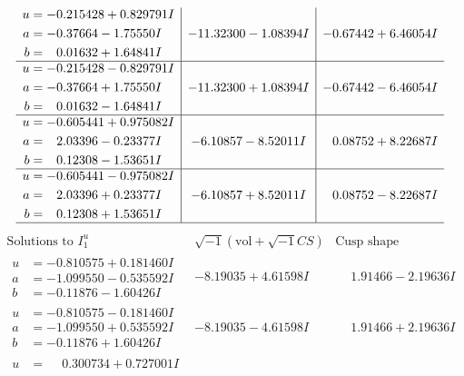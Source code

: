 \documentclass[1p]{elsarticle_modified}
\theoremstyle{definition}
\newcommand{\I}{\sqrt{-1}}
\begin{document}
$$\begin{array}{c|c|c}
\begin{aligned}
u &= -0.215428 + 0.829791 I \\
a &= -0.37664 - 1.75550 I \\
b &= \phantom{-}0.01632 + 1.64841 I\end{aligned}
 & -11.32300 - 1.08394 I & -0.67442 + 6.46054 I \\ \hline\begin{aligned}
u &= -0.215428 - 0.829791 I \\
a &= -0.37664 + 1.75550 I \\
b &= \phantom{-}0.01632 - 1.64841 I\end{aligned}
 & -11.32300 + 1.08394 I & -0.67442 - 6.46054 I \\ \hline\begin{aligned}
u &= -0.605441 + 0.975082 I \\
a &= \phantom{-}2.03396 - 0.23377 I \\
b &= \phantom{-}0.12308 - 1.53651 I\end{aligned}
 & -6.10857 - 8.52011 I & \phantom{-}0.08752 + 8.22687 I \\ \hline\begin{aligned}
u &= -0.605441 - 0.975082 I \\
a &= \phantom{-}2.03396 + 0.23377 I \\
b &= \phantom{-}0.12308 + 1.53651 I\end{aligned}
 & -6.10857 + 8.52011 I & \phantom{-}0.08752 - 8.22687 I\\
 \hline 
 \end{array}$$\newpage$$\begin{array}{c|c|c}  
\text{Solutions to }I^u_{1}& \I (\text{vol} + \sqrt{-1}CS) & \text{Cusp shape}\\
 \hline 
\begin{aligned}
u &= -0.810575 + 0.181460 I \\
a &= -1.099550 - 0.535592 I \\
b &= -0.11876 - 1.60426 I\end{aligned}
 & -8.19035 + 4.61598 I & \phantom{-}1.91466 - 2.19636 I \\ \hline\begin{aligned}
u &= -0.810575 - 0.181460 I \\
a &= -1.099550 + 0.535592 I \\
b &= -0.11876 + 1.60426 I\end{aligned}
 & -8.19035 - 4.61598 I & \phantom{-}1.91466 + 2.19636 I \\ \hline\begin{aligned}
u &= \phantom{-}0.300734 + 0.727001 I \\

\end{aligned}
\end{array}$$
\end{document}
